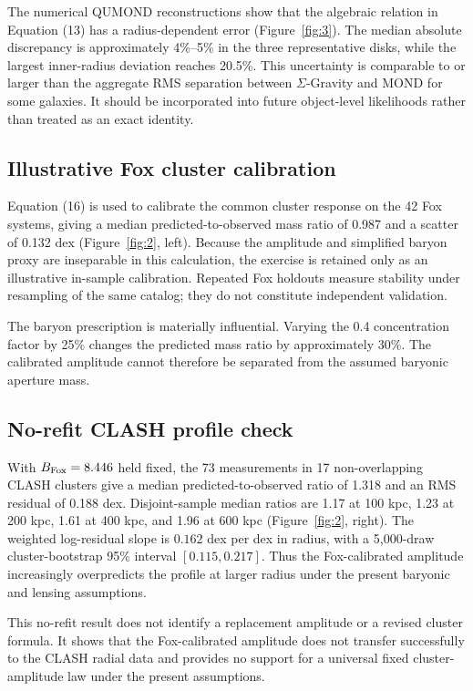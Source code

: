 \documentclass[utf8]{FrontiersinHarvard}
\begin{document}
The numerical QUMOND reconstructions show that the algebraic relation in Equation (13) has a radius-dependent error (Figure~\ref{fig:3}). The median absolute discrepancy is approximately 4\%--5\% in the three representative disks, while the largest inner-radius deviation reaches 20.5\%. This uncertainty is comparable to or larger than the aggregate RMS separation between \(\Sigma\)-Gravity and MOND for some galaxies. It should be incorporated into future object-level likelihoods rather than treated as an exact identity.

\subsection{Illustrative Fox cluster calibration}\label{illustrative-fox-cluster-calibration}

Equation (16) is used to calibrate the common cluster response on the 42 Fox systems, giving a median predicted-to-observed mass ratio of 0.987 and a scatter of 0.132 dex (Figure~\ref{fig:2}, left). Because the amplitude and simplified baryon proxy are inseparable in this calculation, the exercise is retained only as an illustrative in-sample calibration. Repeated Fox holdouts measure stability under resampling of the same catalog; they do not constitute independent validation.

The baryon prescription is materially influential. Varying the 0.4 concentration factor by 25\% changes the predicted mass ratio by approximately 30\%. The calibrated amplitude cannot therefore be separated from the assumed baryonic aperture mass.

\subsection{No-refit CLASH profile check}\label{no-refit-clash-profile-check}

With \(B_{\rm Fox}=8.446\) held fixed, the 73 measurements in 17 non-overlapping CLASH clusters give a median predicted-to-observed ratio of 1.318 and an RMS residual of 0.188 dex. Disjoint-sample median ratios are 1.17 at 100 kpc, 1.23 at 200 kpc, 1.61 at 400 kpc, and 1.96 at 600 kpc (Figure~\ref{fig:2}, right). The weighted log-residual slope is \(0.162\) dex per dex in radius, with a 5,000-draw cluster-bootstrap 95\% interval \([0.115,0.217]\). Thus the Fox-calibrated amplitude increasingly overpredicts the profile at larger radius under the present baryonic and lensing assumptions.

This no-refit result does not identify a replacement amplitude or a revised cluster formula. It shows that the Fox-calibrated amplitude does not transfer successfully to the CLASH radial data and provides no support for a universal fixed cluster-amplitude law under the present assumptions.
\end{document}
